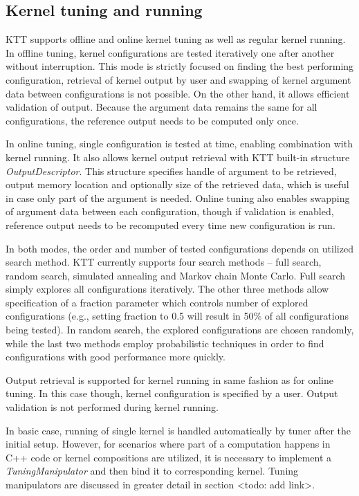 \documentclass
[
    digital, %
    oneside, %
    table, %
    nolof, %
    nolot, %
    nocover %
]{fithesis3}
\begin{document}
\subsection{Kernel tuning and running}
KTT supports offline and online kernel tuning as well as regular kernel running. In offline tuning, kernel configurations are tested iteratively one
after another without interruption. This mode is strictly focused on finding the best performing configuration, retrieval of kernel output by user and
swapping of kernel argument data between configurations is not possible. On the other hand, it allows efficient validation of output. Because the
argument data remains the same for all configurations, the reference output needs to be computed only once.

In online tuning, single configuration is tested at time, enabling combination with kernel running. It also allows kernel output retrieval with
KTT built-in structure \textit{OutputDescriptor}. This structure specifies handle of argument to be retrieved, output memory location and optionally
size of the retrieved data, which is useful in case only part of the argument is needed. Online tuning also enables swapping of argument data between
each configuration, though if validation is enabled, reference output needs to be recomputed every time new configuration is run.

In both modes, the order and number of tested configurations depends on utilized search method. KTT currently supports four search methods -- full
search, random search, simulated annealing and Markov chain Monte Carlo. Full search simply explores all configurations iteratively. The other three
methods allow specification of a fraction parameter which controls number of explored configurations (e.g., setting fraction to 0.5 will result in
50\% of all configurations being tested). In random search, the explored configurations are chosen randomly, while the last two methods employ
probabilistic techniques in order to find configurations with good performance more quickly.

Output retrieval is supported for kernel running in same fashion as for online tuning. In this case though, kernel configuration is specified by a user.
Output validation is not performed during kernel running.

In basic case, running of single kernel is handled automatically by tuner after the initial setup. However, for scenarios where part of a computation
happens in C++ code or kernel compositions are utilized, it is necessary to implement a \textit{TuningManipulator} and then bind it to corresponding kernel.
Tuning manipulators are discussed in greater detail in section <todo: add link>.
\end{document}
